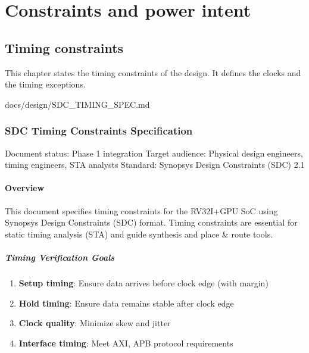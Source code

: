 \part{Constraints and power intent}\label{ds:part:constraints-and-power-intent}

\chapter{Timing constraints}\label{ds:ch:timing-constraints}

This chapter states the timing constraints of the design. It defines the clocks and the timing exceptions.

\begin{relocated}{docs/design/SDC_TIMING_SPEC.md}
\section{SDC Timing Constraints Specification}\label{ds:ch:sdc-timing-spec}

Document status: Phase 1 integration Target audience: Physical design
engineers, timing engineers, STA analysts Standard: Synopsys Design
Constraints (SDC) 2.1

\subsection{Overview}\label{ds:ch:sdc-timing-spec:overview}

This document specifies timing constraints for the RV32I+GPU SoC using
Synopsys Design Constraints (SDC) format. Timing constraints are
essential for static timing analysis (STA) and guide synthesis and place
\& route tools.

\subsubsection{Timing Verification Goals}\label{ds:ch:sdc-timing-spec:timing-verification-goals}

\begin{enumerate}
\def\labelenumi{\arabic{enumi}.}
\tightlist
\item
  \textbf{Setup timing}: Ensure data arrives before clock edge (with
  margin)
\item
  \textbf{Hold timing}: Ensure data remains stable after clock edge
\item
  \textbf{Clock quality}: Minimize skew and jitter
\item
  \textbf{Interface timing}: Meet AXI, APB protocol requirements
\end{enumerate}


\end{relocated}
